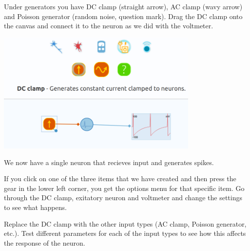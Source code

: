 \begin{Exercise}[title=Single neuron properties]

Under generators you have DC clamp (straight arrow), AC clamp (wavy arrow) and Poisson generator (random noise, question mark). Drag the DC clamp onto the canvas and connect it to the neuron as we did with the voltmeter.


\begin{center}
\includegraphics[width=10cm]{acgenerator.png}
\end{center}

We now have a single neuron that recieves input and generates spikes.


If you click on one of the three items that we have created and then press the gear in the lower left corner, you get the options menu for that specific item. Go through the DC clamp, exitatory neuron and voltmeter and change the settings to see what happens.


Replace the DC clamp with the other input types (AC clamp, Poisson generator, etc.). Test different parameters for each of the input types to see how this affects the response of the neuron.



\end{Exercise}
